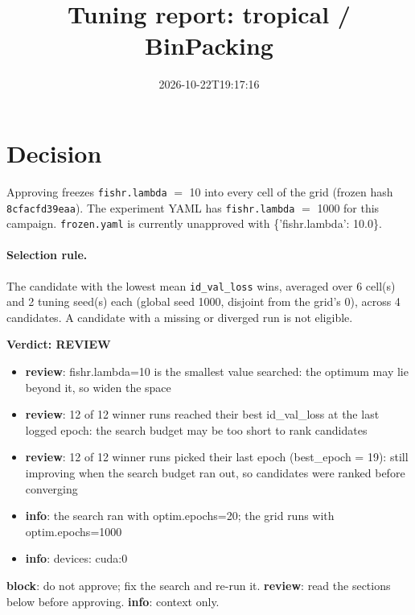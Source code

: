 \documentclass[10pt]{article}
\title{Tuning report: tropical / BinPacking}
\date{2026-10-22T19:17:16}
\begin{document}
\maketitle

\section{Decision}
Approving freezes
\texttt{fishr.lambda} $=$ 10 into every cell of the grid (frozen hash \texttt{8cfacfd39eaa}).
The experiment YAML has
\texttt{fishr.lambda} $=$ 1000 for this campaign.
\texttt{frozen.yaml} is currently unapproved with \{'fishr.lambda': 10.0\}.

\paragraph{Selection rule.} The candidate with the lowest mean \texttt{id\_val\_loss} wins, averaged over 6 cell(s) and 2 tuning seed(s) each (global seed 1000, disjoint from the grid's 0), across 4 candidates. A candidate with a missing or diverged run is not eligible.

\begin{framed}
\noindent\textbf{Verdict: \textcolor{orange!85!black}{REVIEW}}
\begin{itemize}\setlength\itemsep{0pt}
\item \textbf{review}: fishr.lambda=10 is the smallest value searched: the optimum may lie beyond it, so widen the space
\item \textbf{review}: 12 of 12 winner runs reached their best id\_val\_loss at the last logged epoch: the search budget may be too short to rank candidates
\item \textbf{review}: 12 of 12 winner runs picked their last epoch (best\_epoch = 19): still improving when the search budget ran out, so candidates were ranked before converging
\item \textbf{info}: the search ran with optim.epochs=20; the grid runs with optim.epochs=1000
\item \textbf{info}: devices: cuda:0
\end{itemize}
\end{framed}
\noindent\textbf{block}: do not approve; fix the search and re-run it. \textbf{review}: read the sections below before approving. \textbf{info}: context only.
\end{document}
